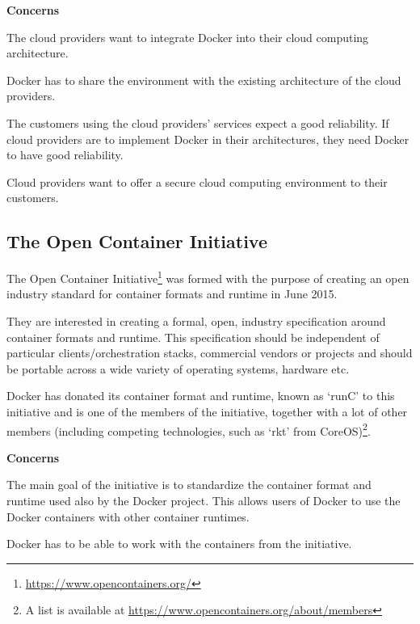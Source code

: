 \textbf{Concerns}
\begin{description}[labelindent=25pt,style=multiline,leftmargin=4.0cm,font=\normalfont\itshape]

\item[\textbf{Portability} (Installability)] The cloud providers want to integrate Docker into their cloud computing architecture.\\ 

\item[\textbf{Compatibility} (Co-Existence)] Docker has to share the environment with the existing architecture of the cloud providers.

\item[\textbf{Reliability}] The customers using the cloud providers' services expect a good reliability. If cloud providers are to implement Docker in their architectures, they need Docker to have good reliability.

\item[\textbf{Security}] Cloud providers want to offer a secure cloud computing environment to their customers.
\end{description}



\subsection*{The Open Container Initiative}

The Open Container Initiative\footnote{\url{https://www.opencontainers.org/}} was formed with the purpose of creating an open industry standard for container formats and runtime in June 2015.

They are interested in creating a formal, open, industry specification around container formats and runtime. This specification should be independent of particular clients/orchestration stacks, commercial vendors or projects and should be portable across a wide variety of operating systems, hardware etc.

Docker has donated its container format and runtime, known as `runC' to this initiative and is one of the members of the initiative, together with a lot of other members (including competing technologies, such as `rkt' from CoreOS)\footnote{A list is available at \url{https://www.opencontainers.org/about/members}}.

\textbf{Concerns}
\begin{description}[labelindent=25pt,style=multiline,leftmargin=4.0cm,font=\normalfont\itshape]

\item[\textbf{Portability}] The main goal of the initiative is to standardize the container format and runtime used also by the Docker project. This allows users of Docker to use the Docker containers with other container runtimes.

\item[\textbf{Compatibility} (Interoperability)] Docker has to be able to work with the containers from the initiative.

\end{description}

